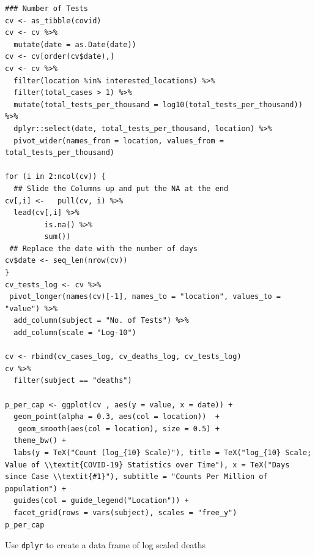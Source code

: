 \documentclass[11pt]{article}
\begin{document}
\begin{listing}[htbp]
\begin{verbatim}
### Number of Tests
cv <- as_tibble(covid)
cv <- cv %>%
  mutate(date = as.Date(date))
cv <- cv[order(cv$date),]
cv <- cv %>%
  filter(location %in% interested_locations) %>%
  filter(total_cases > 1) %>%
  mutate(total_tests_per_thousand = log10(total_tests_per_thousand)) %>%
  dplyr::select(date, total_tests_per_thousand, location) %>%
  pivot_wider(names_from = location, values_from = total_tests_per_thousand)

for (i in 2:ncol(cv)) {
  ## Slide the Columns up and put the NA at the end
cv[,i] <-   pull(cv, i) %>%
  lead(cv[,i] %>%
         is.na() %>%
         sum())
 ## Replace the date with the number of days
cv$date <- seq_len(nrow(cv))
}
cv_tests_log <- cv %>%
 pivot_longer(names(cv)[-1], names_to = "location", values_to = "value") %>%
  add_column(subject = "No. of Tests") %>%
  add_column(scale = "Log-10")

cv <- rbind(cv_cases_log, cv_deaths_log, cv_tests_log)
cv %>%
  filter(subject == "deaths")

p_per_cap <- ggplot(cv , aes(y = value, x = date)) +
  geom_point(alpha = 0.3, aes(col = location))  +
   geom_smooth(aes(col = location), size = 0.5) +
  theme_bw() +
  labs(y = TeX("Count (log_{10} Scale)"), title = TeX("log_{10} Scale; Value of \\textit{COVID-19} Statistics over Time"), x = TeX("Days since Case \\textit{#1}"), subtitle = "Counts Per Million of population") +
  guides(col = guide_legend("Location")) +
  facet_grid(rows = vars(subject), scales = "free_y")
p_per_cap
\end{verbatim}
\caption{\label{org7695401}Use \texttt{dplyr} to create a data frame of log scaled deaths}
\end{listing}
\end{document}
